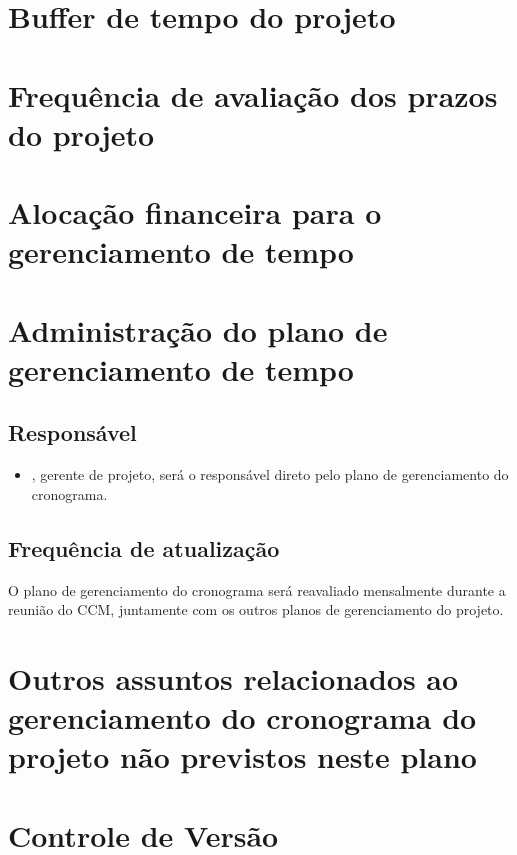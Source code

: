 \section{Buffer de tempo do projeto}

\section{Frequência de avaliação dos prazos do projeto}

\section{Alocação financeira para o gerenciamento de tempo}

\section{Administração do plano de gerenciamento de tempo}

\subsection{Responsável}

\begin{itemize}
	\item \projectManagerName, gerente de projeto, será o responsável direto pelo plano de gerenciamento do cronograma.
\end{itemize}

\subsection{Frequência de atualização}

O plano de gerenciamento do cronograma será reavaliado mensalmente durante a reunião do CCM, juntamente com os outros planos de gerenciamento do projeto.

\section{Outros assuntos relacionados ao gerenciamento do cronograma do projeto não previstos neste plano}

\section{Controle de Versão}

